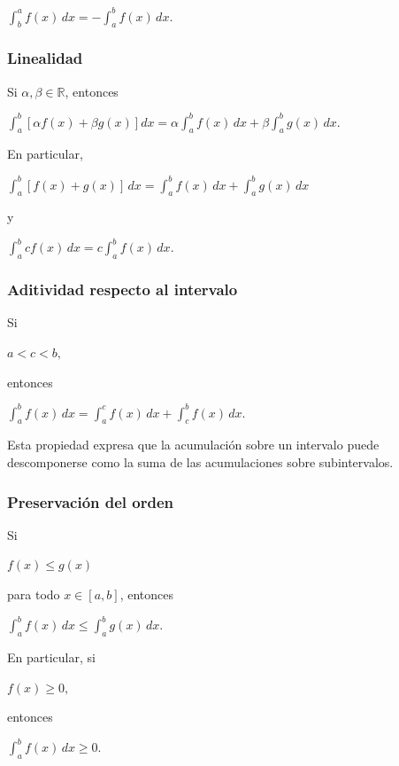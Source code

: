 \documentclass[12pt]{article}
\begin{document}
$
\int_b^a f(x)\,dx
=
-\int_a^b f(x)\,dx.
$


\subsubsection*{Linealidad}

Si $\alpha,\beta\in\mathbb{R}$, entonces

$
\boxed{
\int_a^b
\left[
\alpha f(x)+\beta g(x)
\right]dx
=
\alpha\int_a^b f(x)\,dx
+
\beta\int_a^b g(x)\,dx.
}
$

En particular,

$
\int_a^b [f(x)+g(x)]\,dx
=
\int_a^b f(x)\,dx
+
\int_a^b g(x)\,dx
$

y

$
\int_a^b cf(x)\,dx
=
c\int_a^b f(x)\,dx.
$


\subsubsection*{Aditividad respecto al intervalo}

Si

$
a<c<b,
$

entonces

$
\boxed{
\int_a^b f(x)\,dx
=
\int_a^c f(x)\,dx
+
\int_c^b f(x)\,dx.
}
$

Esta propiedad expresa que la acumulación sobre un intervalo puede
descomponerse como la suma de las acumulaciones sobre subintervalos.


\subsubsection*{Preservación del orden}

Si

$
f(x)\leq g(x)
$

para todo $x\in[a,b]$, entonces

$
\boxed{
\int_a^b f(x)\,dx
\leq
\int_a^b g(x)\,dx.
}
$

En particular, si

$
f(x)\geq0,
$

entonces

$
\int_a^b f(x)\,dx\geq0.
$

\end{document}
